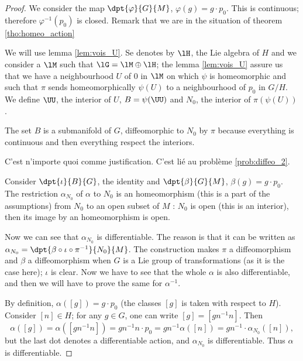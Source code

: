 \begin{proof}
We consider the map $\dpt{\varphi}{G}{M}$, $\varphi(g)=g\cdot p_0$. This is continuous; therefore $\varphi^{-1}(p_0)$ is closed. Remark that we are in the situation of theorem \ref{tho:homeo_action} 

We will use lemma \ref{lem:vois_U}. Se denotes by $\lH$, the Lie algebra of $H$ and we consider a $\lM$ such that $\lG=\lM\oplus\lH$; the lemma \ref{lem:vois_U} assure us that we have a neighbourhood $U$ of $0$ in $\lM$ on which $\psi$ is homeomorphic and such that $\pi$ sends homeomorphically $\psi(U)$ to a neighbourhood of $p_0$ in $G/H$. We define $\UU$, the interior of $U$, $B=\psi(\UU)$ and $N_0$, the interior of $\pi(\psi(U))$.

The set $B$ is a submanifold of $G$, diffeomorphic to $N_0$ by $\pi$ because everything is continuous and then everything respect the interiors.
 
\begin{probleme}
C'est n'importe quoi comme justification. C'est lié au problème \ref{prob:diffeo_2}.
\label{prob:diffeo_1}
\end{probleme}
 
Consider $\dpt{\iota}{B}{G}$, the identity and $\dpt{\beta}{G}{M}$, $\beta(g)=g\cdot p_0$. The restriction $\alpha_{N_0}$ of $\alpha$ to $N_0$ is an homeomorphism (this is a part of the assumptions) from $N_0$ to an open subset of $M$ : $N_0$ is open (this is an interior), then its image by an homeomorphism is open.

Now we can see that $\alpha_{N_0}$ is differentiable. The reason is that it can be written as $\alpha_{N_0}=\dpt{\beta\circ\iota\circ\pi^{-1}}{N_0}{M}$. The construction makes $\pi$ a diffeomorphism and $\beta$ a diffeomorphism when $G$ is a Lie group of transformations (as it is the case here); $\iota$ is clear. Now we have to see that the whole $\alpha$ is also differentiable, and then we will have to prove the same for $\alpha^{-1}$.

By definition, $\alpha([g])=g\cdot p_0$ (the classes $[g]$ is taken with respect to $H$). Consider $[n]\in H$; for any $g\in G$, one can write $[g]=[gn^{-1} n]$. Then
\begin{equation}
  \alpha([g])=\alpha([gn^{-1} n])
             =gn^{-1} n\cdot p_0
	     =gn^{-1}\alpha([n])
	     =gn^{-1}\cdot\alpha_{N_0}([n]),
\end{equation}
but the last dot denotes a differentiable action, and $\alpha_{N_0}$ is differentiable. Thus $\alpha$ is differentiable.


\end{proof}
